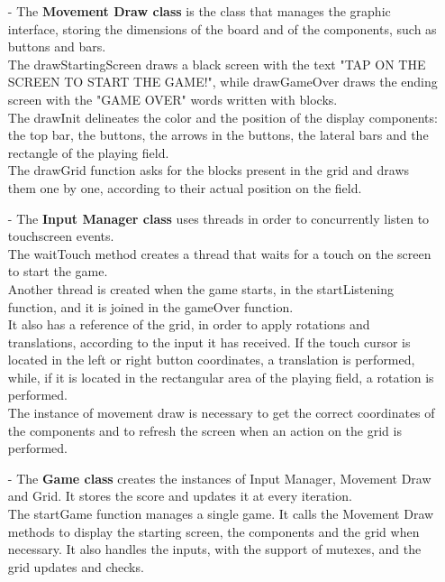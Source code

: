 \documentclass[18pt,oneside,a4paper, titlepage]{article}
\begin{document}
\begin{itemize}
		\item[-] The \textbf{Movement Draw class} is the class that manages the graphic interface, storing the dimensions of the board and of the components, such as buttons and bars.\\
		The drawStartingScreen draws a black screen with the text "TAP ON THE SCREEN TO START THE GAME!", while drawGameOver draws the ending screen with the "GAME OVER" words written with blocks.\\
		The drawInit delineates the color and the position of the display components: the top bar, the buttons, the arrows in the buttons, the lateral bars and the rectangle of the playing field.\\
		The drawGrid function asks for the blocks present in the grid and draws them one by one, according to their actual position on the field.\\
		
		
		\item[-] The \textbf{Input Manager class} uses threads in order to concurrently listen to touchscreen events.\\
		The waitTouch method creates a thread that waits for a touch on the screen to start the game.\\
		Another thread is created when the game starts, in the startListening function, and it is joined in the gameOver function.\\
		It also has a reference of the grid, in order to apply rotations and translations, according to the input it has received. If the touch cursor is located in the left or right button coordinates, a translation is performed, while, if it is located in the rectangular area of the playing field, a rotation is performed.\\
		The instance of movement draw is necessary to get the correct coordinates of the components and to refresh the screen when an action on the grid is performed.\\
		
		\item[-] The \textbf{Game class} creates the instances of Input Manager, Movement Draw and Grid. It stores the score and updates it at every iteration.\\
		The startGame function manages a single game. It calls the Movement Draw methods to display the starting screen, the components and the grid when necessary. It also handles the inputs, with the support of mutexes, and the grid updates and checks.
	\end{itemize}
\end{document}
